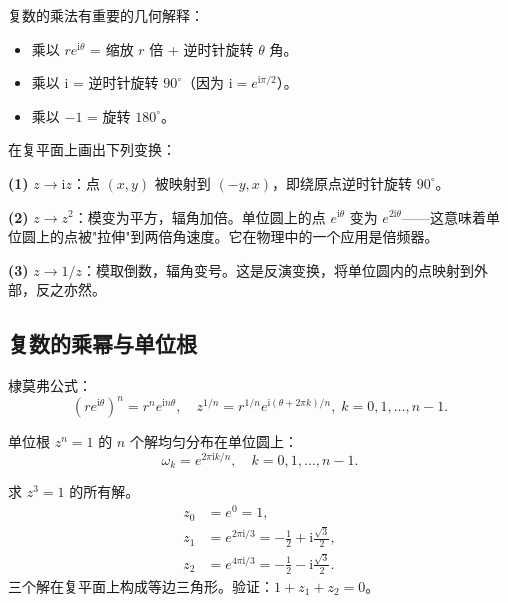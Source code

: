 复数的乘法有重要的几何解释：

\begin{itemize}
\item 乘以 $re^{\mathrm{i}\theta}$ = 缩放 $r$ 倍 + 逆时针旋转 $\theta$ 角。
\item 乘以 $\mathrm{i}$ = 逆时针旋转 $90^\circ$（因为 $\mathrm{i} = e^{\mathrm{i}\pi/2}$）。
\item 乘以 $-1$ = 旋转 $180^\circ$。
\end{itemize}

\begin{example}[几何意义的可视化]
在复平面上画出下列变换：

\textbf{(1)} $z \to \mathrm{i}z$：点 $(x,y)$ 被映射到 $(-y,x)$，即绕原点逆时针旋转 $90^\circ$。

\textbf{(2)} $z \to z^2$：模变为平方，辐角加倍。单位圆上的点 $e^{\mathrm{i}\theta}$ 变为 $e^{2\mathrm{i}\theta}$——这意味着单位圆上的点被"拉伸"到两倍角速度。它在物理中的一个应用是倍频器。

\textbf{(3)} $z \to 1/z$：模取倒数，辐角变号。这是反演变换，将单位圆内的点映射到外部，反之亦然。
\end{example}

\subsection{复数的乘幂与单位根}

棣莫弗公式：
\begin{equation}
(re^{\mathrm{i}\theta})^n = r^n e^{\mathrm{i}n\theta},
\quad
z^{1/n} = r^{1/n} e^{\mathrm{i}(\theta+2\pi k)/n},\; k=0,1,\dots,n-1.
\end{equation}

单位根 $z^n = 1$ 的 $n$ 个解均匀分布在单位圆上：
\begin{equation}
\omega_k = e^{2\pi\mathrm{i}k/n},\quad k=0,1,\dots,n-1.
\end{equation}

\begin{example}
求 $z^3 = 1$ 的所有解。
\begin{align*}
z_0 &= e^{0} = 1,\\
z_1 &= e^{2\pi\mathrm{i}/3} = -\frac12 + \mathrm{i}\frac{\sqrt3}{2},\\
z_2 &= e^{4\pi\mathrm{i}/3} = -\frac12 - \mathrm{i}\frac{\sqrt3}{2}.
\end{align*}
三个解在复平面上构成等边三角形。验证：$1 + z_1 + z_2 = 0$。
\end{example}

